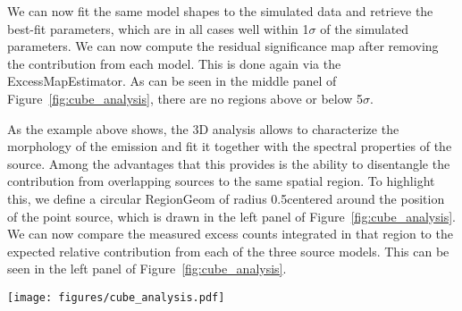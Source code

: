 We can now fit the same model shapes to the simulated data and retrieve the best-fit parameters, which are in all cases well within 1$\sigma$ of the simulated parameters. We can now compute the residual significance map after removing the contribution from each model. This is done again via the ExcessMapEstimator. As can be seen in the middle panel of Figure~\ref{fig:cube_analysis}, there are no regions above or below 5$\sigma$.

As the example above shows, the 3D analysis allows to characterize the morphology of the emission and fit it together with the spectral properties of the source.  Among the advantages that this provides is the ability to disentangle the contribution from overlapping sources to the same spatial region. To highlight this, we define a circular RegionGeom of radius 0.5\textdegree centered around the position of the point source, which is drawn in the left panel of Figure~\ref{fig:cube_analysis}. We can now compare the measured excess counts integrated in that region to the expected relative contribution from each of the three source models. This can be seen in the left panel of Figure~\ref{fig:cube_analysis}.

\begin{figure*}[t]
	\centering
	\texttt{[image: figures/cube\_analysis.pdf]}
	\caption{Example 3D analysis for simulated sources using the \cta \irfs. The left image shows a significance map where the three simulated sources can be seen. The middle figure shows another significance map, but this time after subtracting the best-fit model for each of the sources, which are displayed in black. The right figure shows the contribution of each source model to the circular region of radius 0.5\textdegree drawn in the left image, together with the excess counts inside that region.
	}
	\label{fig:cube_analysis}
\end{figure*}

%
